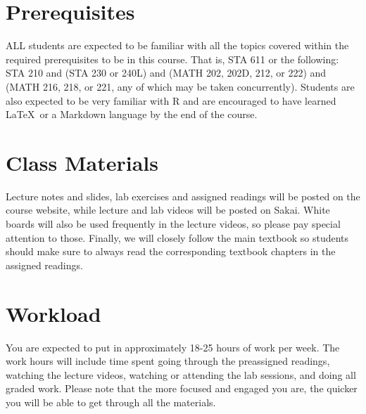 \documentclass[11pt, a4paper]{article}
\begin{document}
\section{Prerequisites}
ALL students are expected to be familiar with all the topics covered within the required prerequisites to be in this course. That is, STA 611 or the following: STA 210 and (STA 230 or 240L) and (MATH 202, 202D, 212, or 222) and (MATH 216, 218, or 221, any of which may be taken concurrently). Students are also expected to be very familiar with \textsf{R} and are encouraged to have learned \LaTeX \ or a Markdown language by the end of the course.


\section{Class Materials}
Lecture notes and slides, lab exercises and assigned readings will be posted on the course website, while lecture and lab videos will be posted on Sakai. White boards will also be used frequently in the lecture videos, so please pay special attention to those. Finally, we will closely follow the main textbook so students should make sure to always read the corresponding textbook chapters in the assigned readings.

\section{Workload}
You are expected to put in approximately 18-25 hours of work per week. The work hours will include time spent going through the preassigned readings, watching the lecture videos, watching or attending the lab sessions, and doing all graded work. Please note that the more focused and engaged you are, the quicker you will be able to get through all the materials.
\end{document}
